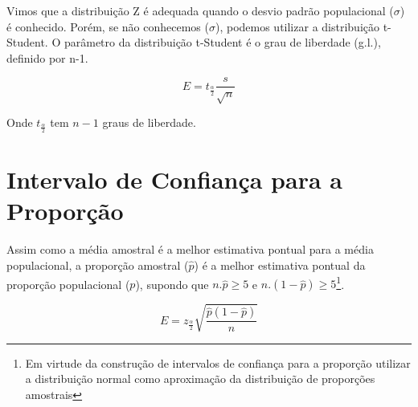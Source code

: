 Vimos que a distribuição Z é adequada quando o desvio padrão populacional (\(\sigma\)) é conhecido. Porém, se não conhecemos (\(\sigma\)), podemos utilizar a distribuição t-Student. O parâmetro da distribuição t-Student é o grau de liberdade (g.l.), definido
por n-1.

\[E = t_\frac{\alpha}{2}\frac{s}{\sqrt{n}}\]

Onde \(t_\frac{\alpha}{2}\) tem \(n-1\) graus de liberdade.

\section{Intervalo de Confiança para a Proporção}

Assim como a média amostral é a melhor estimativa pontual para a média populacional, a proporção amostral (\(\hat{p}\)) é a melhor estimativa pontual da proporção populacional (\({p}\)), supondo que \(n.\hat{p}\geq5\) e \(n.(1-\hat{p})\geq5\)\footnote{Em virtude da construção de intervalos de confiança para a proporção utilizar a distribuição normal como aproximação da distribuição de proporções amostrais}.

\[E = z_\frac{\alpha}{2}\sqrt{\frac{\hat{p}(1-\hat{p})}{n}}\]